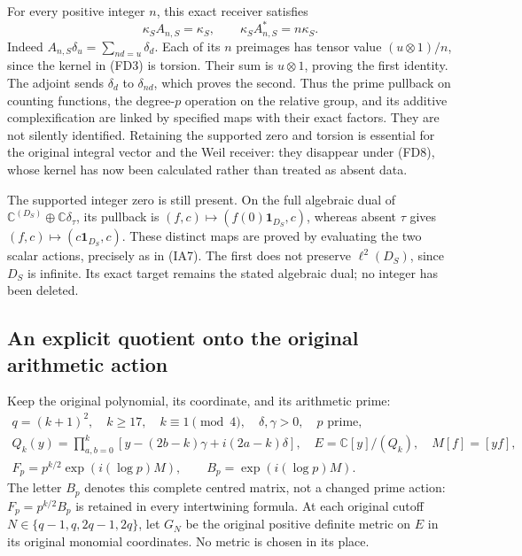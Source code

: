 \documentclass[11pt,a4paper]{article}
\theoremstyle{definition}\newtheorem{definition}[theorem]{Definition}
\begin{document}
For every positive integer $n$, this exact receiver satisfies
\[
 \kappa_S A_{n,S}=\kappa_S,\qquad
 \kappa_S A_{n,S}^*=n\kappa_S.
 \tag{FD9}
\]
Indeed $A_{n,S}\delta_u=\sum_{nd=u}\delta_d$. Each of its $n$
preimages has tensor value $(u\otimes1)/n$, since the kernel in
(FD3) is torsion. Their sum is $u\otimes1$, proving the first
identity. The adjoint sends $\delta_d$ to $\delta_{nd}$, which proves
the second. Thus the prime pullback on counting functions, the
degree-$p$ operation on the relative group, and its additive
complexification are linked by specified maps with their exact
factors. They are not silently identified. Retaining the supported
zero and torsion is essential for the original integral vector and
the Weil receiver: they disappear under (FD8), whose kernel has now
been calculated rather than treated as absent data.

The supported integer zero is still present. On the full algebraic
dual of $\mathbb C^{(D_S)}\oplus\mathbb C\delta_\tau$, its pullback is
$(f,c)\mapsto(f(0)\mathbf1_{D_S},c)$, whereas absent $\tau$ gives
$(f,c)\mapsto(c\mathbf1_{D_S},c)$. These distinct maps are proved by
evaluating the two scalar actions, precisely as in (IA7). The first
does not preserve $\ell^2(D_S)$, since $D_S$ is infinite. Its exact
target remains the stated algebraic dual; no integer has been deleted.

\subsection{An explicit quotient onto the original arithmetic action}
Keep the original polynomial, its coordinate, and its arithmetic prime:
\[
 \begin{gathered}
 q=(k+1)^2,\quad k\ge17,\quad k\equiv1\pmod4,
 \quad\delta,\gamma>0,\quad p\text{ prime},\\
 Q_k(y)=\prod_{a,b=0}^k[y-(2b-k)\gamma+i(2a-k)\delta],
 \quad E=\mathbb C[y]/(Q_k),\quad M[f]=[yf],\\
 F_p=p^{k/2}\exp(i(\log p)M),\qquad B_p=\exp(i(\log p)M).
 \end{gathered}\tag{AQ1}
\]
The letter $B_p$ denotes this complete centred matrix, not a changed
prime action: $F_p=p^{k/2}B_p$ is retained in every intertwining formula.
At each original cutoff $N\in\{q-1,q,2q-1,2q\}$, let $G_N$ be
the original positive definite metric on $E$ in its original monomial
coordinates. No metric is chosen in its place.
\end{document}
